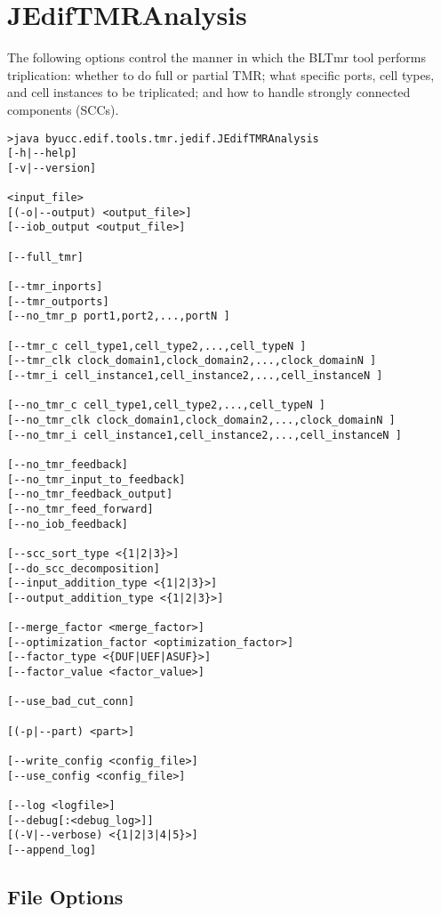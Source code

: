 \section{JEdifTMRAnalysis}

The following options control the manner in which the BLTmr tool performs
triplication: whether to do full or partial TMR; what specific ports, cell
types, and cell instances to be triplicated; and how to handle strongly
connected components (SCCs).

\begin{verbatim}
>java byucc.edif.tools.tmr.jedif.JEdifTMRAnalysis
[-h|--help] 
[-v|--version] 

<input_file> 
[(-o|--output) <output_file>] 
[--iob_output <output_file>] 

[--full_tmr] 

[--tmr_inports] 
[--tmr_outports] 
[--no_tmr_p port1,port2,...,portN ] 

[--tmr_c cell_type1,cell_type2,...,cell_typeN ] 
[--tmr_clk clock_domain1,clock_domain2,...,clock_domainN ] 
[--tmr_i cell_instance1,cell_instance2,...,cell_instanceN ] 

[--no_tmr_c cell_type1,cell_type2,...,cell_typeN ] 
[--no_tmr_clk clock_domain1,clock_domain2,...,clock_domainN ] 
[--no_tmr_i cell_instance1,cell_instance2,...,cell_instanceN ] 

[--no_tmr_feedback] 
[--no_tmr_input_to_feedback] 
[--no_tmr_feedback_output] 
[--no_tmr_feed_forward] 
[--no_iob_feedback] 

[--scc_sort_type <{1|2|3}>] 
[--do_scc_decomposition] 
[--input_addition_type <{1|2|3}>] 
[--output_addition_type <{1|2|3}>] 

[--merge_factor <merge_factor>] 
[--optimization_factor <optimization_factor>] 
[--factor_type <{DUF|UEF|ASUF}>] 
[--factor_value <factor_value>] 

[--use_bad_cut_conn] 

[(-p|--part) <part>] 

[--write_config <config_file>]
[--use_config <config_file>]

[--log <logfile>]
[--debug[:<debug_log>]]
[(-V|--verbose) <{1|2|3|4|5}>]
[--append_log]

\end{verbatim}

\subsection{File Options}

